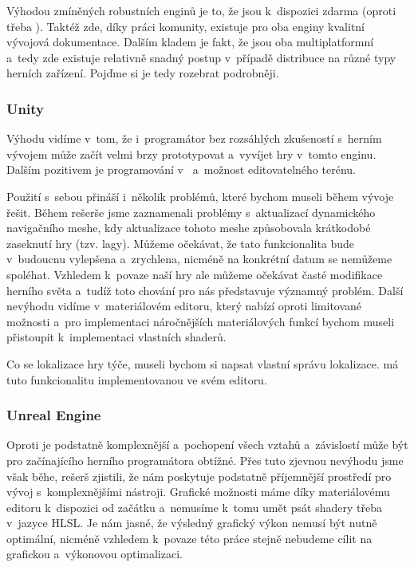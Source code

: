 Výhodou zmíněných robustních enginů je to, že jsou k~dispozici zdarma (oproti třeba \CRY{}). Taktéž zde, díky práci komunity, existuje pro oba enginy kvalitní vývojová dokumentace. Dalším kladem je fakt, že jsou oba multiplatformní a~tedy zde existuje relativně snadný postup v~případě distribuce na různé typy herních zařízení. Pojďme si je tedy rozebrat podrobněji.

\subsubsection{Unity}
Výhodu \UN{} vidíme v~tom, že i~programátor bez rozsáhlých zkušeností s~herním vývojem může začít velmi brzy prototypovat a~vyvíjet hry v~tomto enginu. Dalším pozitivem je programování v~\CS{} a~možnost editovatelného terénu.

Použití \UN{} s~sebou přináší i~několik problémů, které bychom museli během vývoje řešit. Během rešerše jsme zaznamenali problémy s~aktualizací dynamického navigačního meshe, kdy aktualizace tohoto meshe způsobovala krátkodobé zaseknutí hry (tzv. lagy). Můžeme očekávat, že tato funkcionalita bude v~budoucnu vylepšena a~zrychlena, nicméně na konkrétní datum se nemůžeme spoléhat. Vzhledem k~povaze naší hry ale můžeme očekávat časté modifikace herního světa a~tudíž toto chování pro nás představuje významný problém. Další nevýhodu vidíme v~materiálovém editoru, který nabízí oproti \UE{} limitované možnosti a~pro implementaci náročnějších materiálových funkcí bychom museli přistoupit k~implementaci vlastních shaderů.

Co se lokalizace hry týče, museli bychom si napsat vlastní správu lokalizace\citep{unity_loc}. \UE{} má tuto funkcionalitu implementovanou ve svém editoru\citep{ue_loc}.


\subsubsection{Unreal Engine}
Oproti \UN{} je \UE{} podstatně komplexnější a~pochopení všech vztahů a~závislostí může být pro začínajícího herního programátora obtížné. Přes tuto zjevnou nevýhodu jsme však běhe, rešerš zjistili, že \UE{} nám poskytuje podstatně příjemnější prostředí pro vývoj s~komplexnějšími nástroji. Grafické možnosti máme díky materiálovému editoru k~dispozici od začátku a~nemusíme k~tomu umět psát shadery třeba v~jazyce HLSL. Je nám jasné, že výsledný grafický výkon nemusí být nutně optimální, nicméně vzhledem k~povaze této práce stejně nebudeme cílit na grafickou a~výkonovou optimalizaci.

